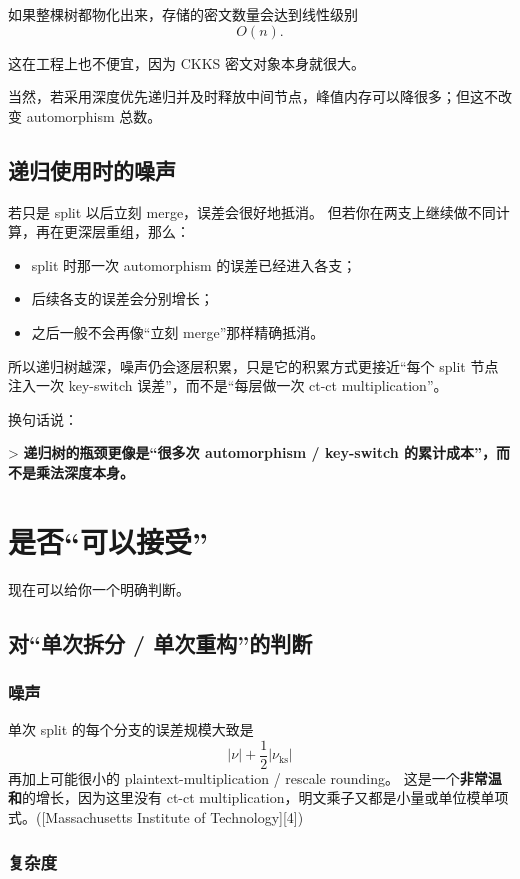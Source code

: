 \documentclass{article}
\begin{document}
如果整棵树都物化出来，存储的密文数量会达到线性级别
\[
O(n).
\]

这在工程上也不便宜，因为 CKKS 密文对象本身就很大。

当然，若采用深度优先递归并及时释放中间节点，峰值内存可以降很多；但这不改变 automorphism 总数。

\subsection{递归使用时的噪声}

若只是 split 以后立刻 merge，误差会很好地抵消。
但若你在两支上继续做不同计算，再在更深层重组，那么：

\begin{itemize}
    \item split 时那一次 automorphism 的误差已经进入各支；
    \item 后续各支的误差会分别增长；
    \item 之后一般不会再像“立刻 merge”那样精确抵消。
\end{itemize}

所以递归树越深，噪声仍会逐层积累，只是它的积累方式更接近“每个 split 节点注入一次 key-switch 误差”，而不是“每层做一次 ct-ct multiplication”。

换句话说：

> \textbf{递归树的瓶颈更像是“很多次 automorphism / key-switch 的累计成本”，而不是乘法深度本身。}

\section{是否“可以接受”}

现在可以给你一个明确判断。

\subsection{对“单次拆分 / 单次重构”的判断}

\subsubsection{噪声}

单次 split 的每个分支的误差规模大致是
\[
|\nu|+\frac12|\nu_{\mathrm{ks}}|
\]
再加上可能很小的 plaintext-multiplication / rescale rounding。
这是一个\textbf{非常温和}的增长，因为这里没有 ct-ct multiplication，明文乘子又都是小量或单位模单项式。([Massachusetts Institute of Technology][4])

\subsubsection{复杂度}
\end{document}
